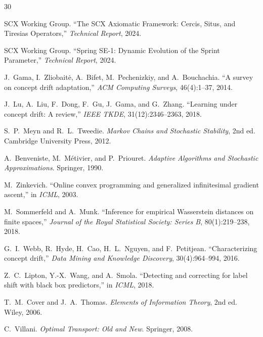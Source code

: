 \documentclass[12pt,a4paper]{article}
\begin{document}

\begin{thebibliography}{30}

SCX Working Group.
\newblock ``The SCX Axiomatic Framework: Cercis, Situs, and Tiresias
Operators,''
\newblock \emph{Technical Report}, 2024.

SCX Working Group.
\newblock ``Spring SE-1: Dynamic Evolution of the Sprint Parameter,''
\newblock \emph{Technical Report}, 2024.

J.~Gama, I.~Zliobait\.e, A.~Bifet, M.~Pechenizkiy, and A.~Bouchachia.
\newblock ``A survey on concept drift adaptation,''
\newblock \emph{ACM Computing Surveys}, 46(4):1--37, 2014.

J.~Lu, A.~Liu, F.~Dong, F.~Gu, J.~Gama, and G.~Zhang.
\newblock ``Learning under concept drift: A review,''
\newblock \emph{IEEE TKDE}, 31(12):2346--2363, 2018.

S.~P.~Meyn and R.~L.~Tweedie.
\newblock \emph{Markov Chains and Stochastic Stability}, 2nd ed.
\newblock Cambridge University Press, 2012.

A.~Benveniste, M.~M\'etivier, and P.~Priouret.
\newblock \emph{Adaptive Algorithms and Stochastic Approximations}.
\newblock Springer, 1990.

M.~Zinkevich.
\newblock ``Online convex programming and generalized infinitesimal gradient
ascent,''
\newblock in \emph{ICML}, 2003.

M.~Sommerfeld and A.~Munk.
\newblock ``Inference for empirical Wasserstein distances on finite
spaces,''
\newblock \emph{Journal of the Royal Statistical Society: Series B},
80(1):219--238, 2018.

G.~I.~Webb, R.~Hyde, H.~Cao, H.~L.~Nguyen, and F.~Petitjean.
\newblock ``Characterizing concept drift,''
\newblock \emph{Data Mining and Knowledge Discovery}, 30(4):964--994, 2016.

Z.~C.~Lipton, Y.-X.~Wang, and A.~Smola.
\newblock ``Detecting and correcting for label shift with black box
predictors,''
\newblock in \emph{ICML}, 2018.

T.~M.~Cover and J.~A.~Thomas.
\newblock \emph{Elements of Information Theory}, 2nd ed.
\newblock Wiley, 2006.

C.~Villani.
\newblock \emph{Optimal Transport: Old and New}.
\newblock Springer, 2008.

\end{thebibliography}
\end{document}
